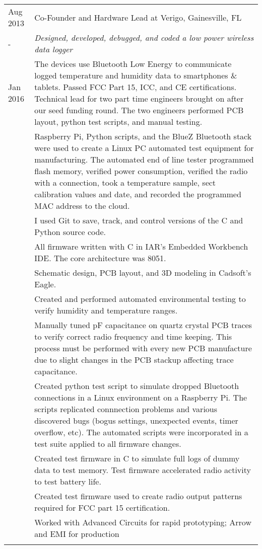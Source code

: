 \documentclass[a4paper,10pt]{article} %
\begin{document}
\begin{tabular}{p{1.6cm}|p{12.4cm}}
\centering Aug 2013 &  Co-Founder and Hardware Lead at Verigo, Gainesville, FL \\
\centering -& \emph{Designed, developed, debugged, and coded a low power wireless data logger }\\
\centering Jan 2016&\footnotesize{The devices use Bluetooth Low Energy to communicate logged temperature and humidity data to smartphones \& tablets. Passed FCC Part 15, ICC, and CE certifications.
Technical lead for two part time engineers brought on after our seed funding round. The two engineers performed PCB layout, python test scripts, and manual testing.}\\
&\footnotesize{Raspberry Pi, Python scripts, and the BlueZ Bluetooth stack were used to create a Linux PC automated test equipment for manufacturing. The automated end of line tester programmed flash memory, verified power consumption, verified the radio with a connection, took a temperature sample, sect calibration values and date, and recorded the programmed MAC address to the cloud.}\\
&\footnotesize{I used Git to save, track, and control versions of the C and Python source code.}\\
&\footnotesize{All firmware written with C in IAR's Embedded Workbench IDE. The core architecture was 8051.}\\
&\footnotesize{Schematic design, PCB layout, and 3D modeling in Cadsoft's Eagle.}\\
&\footnotesize{Created and performed automated environmental testing to verify humidity and temperature ranges.}\\
&\footnotesize{Manually tuned pF capacitance on quartz crystal PCB traces to verify correct radio frequency and time keeping. This process must be performed with every new PCB manufacture due to slight changes in the PCB stackup affecting trace capacitance.}\\
&\footnotesize{Created python test script to simulate dropped Bluetooth connections in a Linux environment on a Raspberry Pi.
The scripts replicated connnection problems and various discovered bugs (bogus settings, unexpected events, timer overflow, etc). The automated scripts were incorporated in a test suite applied to all firmware changes.}\\
&\footnotesize{Created test firmware in C to simulate full logs of dummy data to test memory. Test firmware accelerated radio activity to test battery life.}\\
&\footnotesize{Created test firmware used to create radio output patterns required for FCC part 15 certification.}\\
&\footnotesize{Worked with Advanced Circuits for rapid prototyping; Arrow and EMI for production}\\
\multicolumn{2}{c}{} \\


\end{tabular}
\end{document}
